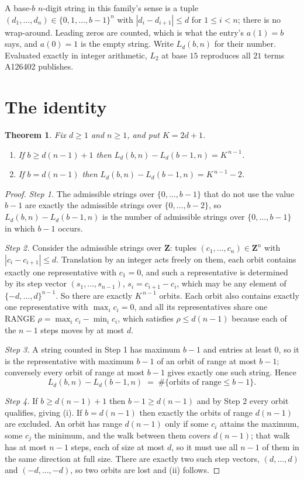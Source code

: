 \documentclass[11pt,a4paper]{article}
\theoremstyle{plain}
\newtheorem{theorem}{Theorem}
\theoremstyle{definition}
\begin{document}
A base-$b$ $n$-digit string in this family's sense is a tuple
$(d_1,\dots,d_n)\in\{0,1,\dots,b-1\}^{n}$ with $|d_i-d_{i+1}|\le d$ for $1\le i<n$; there
is no wrap-around. Leading zeros are counted, which is what the entry's $a(1)=b$ says, and
$a(0)=1$ is the empty string. Write $L_d(b,n)$ for their number. Evaluated exactly in integer
arithmetic, $L_{2}$ at base $15$ reproduces all $21$ terms A126402 publishes.

\section{The identity}

\begin{theorem}
Fix $d\ge1$ and $n\ge1$, and put $K=2d+1$.
\begin{enumerate}
\item[(i)] If $b\ge d(n-1)+1$ then $L_d(b,n)-L_d(b-1,n)=K^{\,n-1}$.
\item[(ii)] If $b=d(n-1)$ then $L_d(b,n)-L_d(b-1,n)=K^{\,n-1}-2$.
\end{enumerate}
\end{theorem}

\begin{proof}
\emph{Step 1.} The admissible strings over $\{0,\dots,b-1\}$ that do not use the value $b-1$
are exactly the admissible strings over $\{0,\dots,b-2\}$, so $L_d(b,n)-L_d(b-1,n)$ is the
number of admissible strings over $\{0,\dots,b-1\}$ in which $b-1$ occurs.

\emph{Step 2.} Consider the admissible strings over $\mathbf{Z}$: tuples
$(c_1,\dots,c_n)\in\mathbf{Z}^{n}$ with $|c_i-c_{i+1}|\le d$. Translation by an integer acts
freely on them, each orbit contains exactly one representative with $c_1=0$, and such a
representative is determined by its step vector $(s_1,\dots,s_{n-1})$, $s_i=c_{i+1}-c_i$,
which may be any element of $\{-d,\dots,d\}^{n-1}$. So there are exactly $K^{\,n-1}$ orbits.
Each orbit also contains exactly one representative with $\max_i c_i=0$, and all its
representatives share one RANGE $\rho=\max_ic_i-\min_ic_i$, which satisfies
$\rho\le d(n-1)$ because each of the $n-1$ steps moves by at most $d$.

\emph{Step 3.} A string counted in Step 1 has maximum $b-1$ and entries at least $0$, so it is
the representative with maximum $b-1$ of an orbit of range at most $b-1$; conversely every orbit
of range at most $b-1$ gives exactly one such string. Hence
\[
L_d(b,n)-L_d(b-1,n)\;=\;\#\{\text{orbits of range}\le b-1\} .
\]

\emph{Step 4.} If $b\ge d(n-1)+1$ then $b-1\ge d(n-1)$ and by Step 2 every orbit qualifies,
giving (i). If $b=d(n-1)$ then exactly the orbits of range $d(n-1)$ are excluded. An orbit has
range $d(n-1)$ only if some $c_i$ attains the maximum, some $c_j$ the minimum, and the walk
between them covers $d(n-1)$; that walk has at most $n-1$ steps, each of size at most $d$, so it
must use all $n-1$ of them in the same direction at full size. There are exactly two such step
vectors, $(d,\dots,d)$ and $(-d,\dots,-d)$, so two orbits are lost and (ii) follows.
\end{proof}
\end{document}
